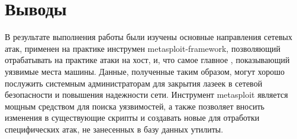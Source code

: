 \documentclass[a4paper, 14pt]{article}				%
\begin{document}
\section{Выводы}
В результате выполнения работы были изучены основные направления сетевых атак, применен на практике инструмен metasploit-framework, позволяющий отрабатывать на практике атаки на хост, и, что самое главное , показывающий уязвимые места машины. Данные, полученные таким образом, могут хорошо послужить системным администраторам для закрытия лазеек в сетевой безопасности и повышения надежности сети. Инструмент metasploit является мощным средством для поиска уязвимостей, а также позволяет вносить изменения в существующие скрипты и создавать новые для отработки специфических атак, не занесенных в базу данных утилиты.
\end{document}
